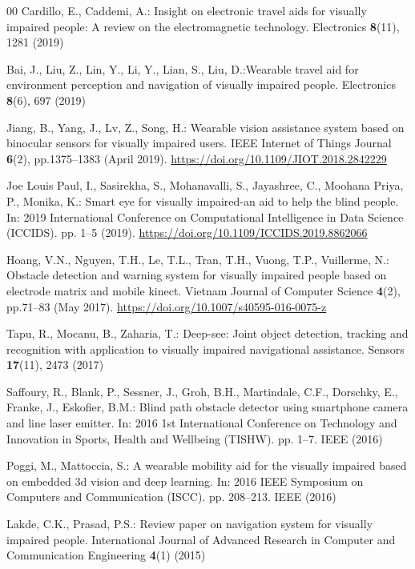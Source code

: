 \documentclass[preprint,12pt]{elsarticle}
\begin{document}
\begin{thebibliography}{00}
Cardillo, E., Caddemi, A.: Insight on electronic travel aids for visually impaired people: A review on the electromagnetic technology. Electronics \textbf{8}(11), 1281 (2019)

Bai, J., Liu, Z., Lin, Y., Li, Y., Lian, S., Liu, D.:Wearable travel aid for environment perception and navigation of visually impaired people. Electronics \textbf{8}(6), 697 (2019)

Jiang, B., Yang, J., Lv, Z., Song, H.: Wearable vision assistance system based on binocular sensors for visually impaired users. IEEE Internet of Things Journal \textbf{6}(2), pp.1375--1383 (April 2019). \url{https://doi.org/10.1109/JIOT.2018.2842229}

Joe Louis Paul, I., Sasirekha, S., Mohanavalli, S., Jayashree, C., Moohana Priya, P., Monika, K.: Smart eye for visually impaired-an aid to help the blind people. In: 2019 International Conference on Computational Intelligence in Data Science (ICCIDS). pp. 1--5 (2019). \url{https://doi.org/10.1109/ICCIDS.2019.8862066}

Hoang, V.N., Nguyen, T.H., Le, T.L., Tran, T.H., Vuong, T.P., Vuillerme, N.: Obstacle detection and warning system for visually impaired people based on electrode matrix and mobile kinect. Vietnam Journal of Computer Science \textbf{4}(2), pp.71--83 (May 2017). \url{https://doi.org/10.1007/s40595-016-0075-z}

Tapu, R., Mocanu, B., Zaharia, T.: Deep-see: Joint object detection, tracking and recognition with application to visually impaired navigational assistance. Sensors \textbf{17}(11), 2473 (2017)

Saffoury, R., Blank, P., Sessner, J., Groh, B.H., Martindale, C.F., Dorschky, E., Franke, J., Eskofier, B.M.: Blind path obstacle detector using smartphone camera and line laser emitter. In: 2016 1st International Conference on Technology and Innovation in Sports, Health and Wellbeing (TISHW). pp. 1--7. IEEE (2016)

Poggi, M., Mattoccia, S.: A wearable mobility aid for the visually impaired based on embedded 3d vision and deep learning. In: 2016 IEEE Symposium on Computers and Communication (ISCC). pp. 208--213. IEEE (2016)

Lakde, C.K., Prasad, P.S.: Review paper on navigation system for visually impaired people. International Journal of Advanced Research in Computer and Communication Engineering \textbf{4}(1) (2015)


\end{thebibliography}
\end{document}
